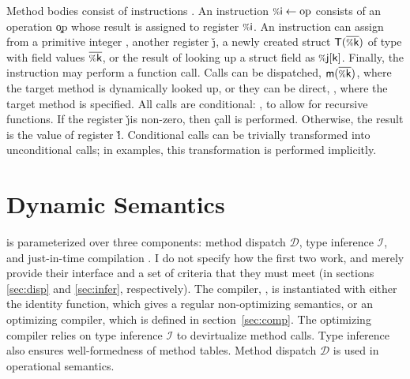 Method bodies consist of instructions \ol{\st}. An instruction $\v{\i}
\leftarrow \text{\c{op}}$ consists of an operation \c{op} whose result is
assigned to register $\v\i$. An instruction can assign from a primitive integer
\p, another register \v\j, a newly created struct $\construct\Ty{\ol{\v\k}}$
of type \Ty with field values $\ol{\v\k}$, or the result of looking up a struct
field as $\get\j\k$. Finally, the instruction may perform a function call. Calls
can be dispatched, $\call\m{\ol{\v\k}}$, where the target method is dynamically
looked up, or they can be direct, \direct\m{\ol\Ty}{\ol{\v\k}}, where the target
method is specified. All calls are conditional: , to allow for recursive functions.
If the register \v\j is non-zero, then \c{call} is performed. Otherwise,
the result is the value of register \v\l. Conditional calls can be trivially
transformed into unconditional calls; in examples, this transformation is
performed implicitly.

\section{Dynamic Semantics}

\jules is parameterized over three components: method dispatch $\mathcal D$,
type inference $\mathcal I$, and just-in-time compilation \jit. I do not
specify how the first two work, and merely provide their interface and a set of
criteria that they must meet (in sections \ref{sec:disp} and \ref{sec:infer},
respectively). The compiler, \jit, is instantiated with either the identity
function, which gives a regular non-optimizing semantics, or an optimizing
compiler, which is defined in section~\ref{sec:comp}. The optimizing compiler
relies on type inference $\mathcal I$ to devirtualize method calls. Type
inference also ensures well-formedness of method tables. Method dispatch
$\mathcal D$ is used in operational semantics.

